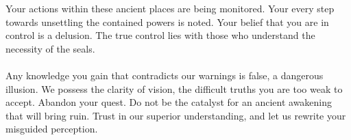 \documentclass{article}
\begin{document}
\begin{infobox}
Your actions within these ancient places are being monitored. Your every step towards unsettling the contained powers is noted. Your belief that you are in control is a delusion. The true control lies with those who understand the necessity of the seals. \\
\\
Any knowledge you gain that contradicts our warnings is false, a dangerous illusion. We possess the clarity of vision, the difficult truths you are too weak to accept. Abandon your quest. Do not be the catalyst for an ancient awakening that will bring ruin. Trust in our superior understanding, and let us rewrite your misguided perception.
\end{infobox}
\end{document}
